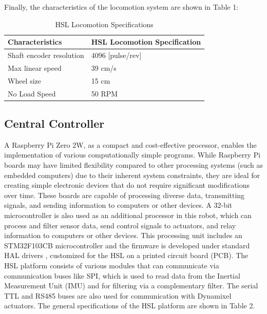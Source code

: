 \documentclass[conference]{IEEEtran}
\begin{document}
Finally, the characteristics of the locomotion system are shown in Table 1:
\begin{table}[htbp]
\centering
\caption{HSL Locomotion Specifications}
\begin{tabular}{|l|l|}
\hline
\textbf{Characteristics}   & \textbf{HSL Locomotion Specification} \\ \hline
Shaft encoder resolution   & 4096 [pulse/rev]                      \\ \hline
Max linear speed           & 39 cm/s                               \\ \hline
Wheel size                 & 15 cm                                 \\ \hline
No Load Speed              & 50 RPM                                \\ \hline
\end{tabular}
\label{tab:hsl_locomotion}
\end{table}

\subsection{Central Controller}
A Raspberry Pi Zero 2W, as a compact and cost-effective processor, enables the implementation of various computationally simple programs. While Raspberry Pi boards may have limited flexibility compared to other processing systems (such as embedded computers) due to their inherent system constraints, they are ideal for creating simple electronic devices that do not require significant modifications over time. These boards are capable of processing diverse data, transmitting signals, and sending information to computers or other devices. A 32-bit microcontroller is also used as an additional processor in this robot, which can process and filter sensor data, send control signals to actuators, and relay information to computers or other devices. This processing unit includes an STM32F103CB microcontroller and the firmware is developed under standard HAL drivers \cite{STM32_ReferenceManual}, customized for the HSL on a printed circuit board (PCB). The HSL platform consists of various modules that can communicate via communication buses like SPI, which is used to read data from the Inertial Measurement Unit (IMU) and for filtering via a complementary filter. The serial TTL and RS485 buses are also used for communication with Dynamixel actuators. The general specifications of the HSL platform are shown in Table 2.
\end{document}
